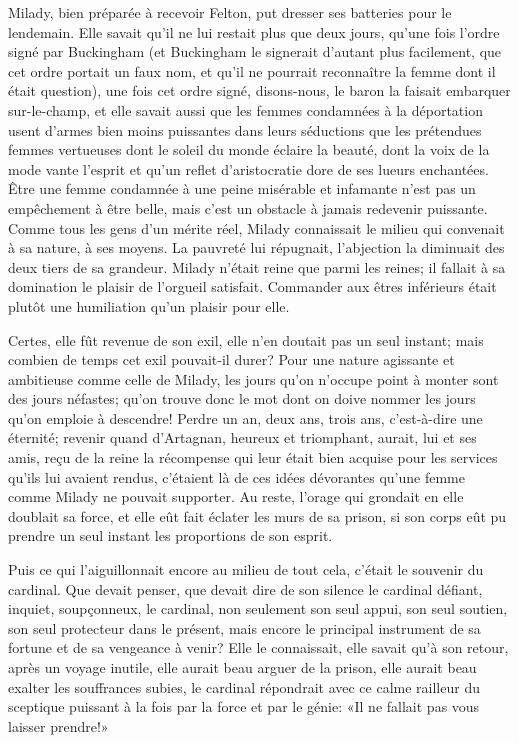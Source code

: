 Milady, bien préparée à recevoir Felton, put dresser ses batteries pour le lendemain. Elle savait qu'il ne lui restait plus que deux jours, qu'une fois l'ordre signé par Buckingham (et Buckingham le signerait d'autant plus facilement, que cet ordre portait un faux nom, et qu'il ne pourrait reconnaître la femme dont il était question), une fois cet ordre signé, disons-nous, le baron la faisait embarquer sur-le-champ, et elle savait aussi que les femmes condamnées à la déportation usent d'armes bien moins puissantes dans leurs séductions que les prétendues femmes vertueuses dont le soleil du monde éclaire la beauté, dont la voix de la mode vante l'esprit et qu'un reflet d'aristocratie dore de ses lueurs enchantées. Être une femme condamnée à une peine misérable et infamante n'est pas un empêchement à être belle, mais c'est un obstacle à jamais redevenir puissante. Comme tous les gens d'un mérite réel, Milady connaissait le milieu qui convenait à sa nature, à ses moyens. La pauvreté lui répugnait, l'abjection la diminuait des deux tiers de sa grandeur. Milady n'était reine que parmi les reines; il fallait à sa domination le plaisir de l'orgueil satisfait. Commander aux êtres inférieurs était plutôt une humiliation qu'un plaisir pour elle. 

Certes, elle fût revenue de son exil, elle n'en doutait pas un seul instant; mais combien de temps cet exil pouvait-il durer? Pour une nature agissante et ambitieuse comme celle de Milady, les jours qu'on n'occupe point à monter sont des jours néfastes; qu'on trouve donc le mot dont on doive nommer les jours qu'on emploie à descendre! Perdre un an, deux ans, trois ans, c'est-à-dire une éternité; revenir quand d'Artagnan, heureux et triomphant, aurait, lui et ses amis, reçu de la reine la récompense qui leur était bien acquise pour les services qu'ils lui avaient rendus, c'étaient là de ces idées dévorantes qu'une femme comme Milady ne pouvait supporter. Au reste, l'orage qui grondait en elle doublait sa force, et elle eût fait éclater les murs de sa prison, si son corps eût pu prendre un seul instant les proportions de son esprit. 

Puis ce qui l'aiguillonnait encore au milieu de tout cela, c'était le souvenir du cardinal. Que devait penser, que devait dire de son silence le cardinal défiant, inquiet, soupçonneux, le cardinal, non seulement son seul appui, son seul soutien, son seul protecteur dans le présent, mais encore le principal instrument de sa fortune et de sa vengeance à venir? Elle le connaissait, elle savait qu'à son retour, après un voyage inutile, elle aurait beau arguer de la prison, elle aurait beau exalter les souffrances subies, le cardinal répondrait avec ce calme railleur du sceptique puissant à la fois par la force et par le génie: «Il ne fallait pas vous laisser prendre!» 

